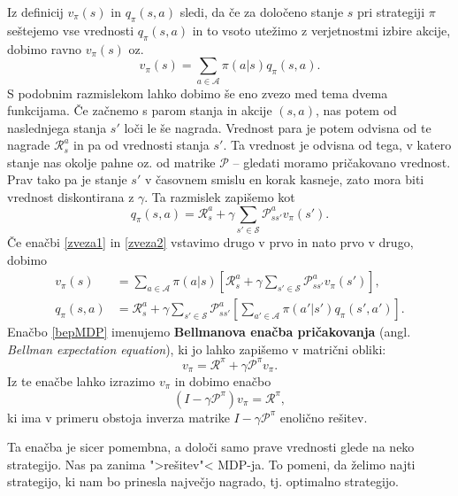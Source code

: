\documentclass[12pt,a4paper]{amsart}
\theoremstyle{definition} %
\theoremstyle{plain} %
\begin{document}
Iz definicij $v_\pi(s)$ in $q_\pi(s, a)$ sledi, da če za določeno stanje $s$ pri strategiji $\pi$ 
seštejemo vse vrednosti $q_\pi(s, a)$ in to vsoto utežimo z verjetnostmi izbire akcije, dobimo ravno 
$v_\pi(s)$ oz. 
\begin{equation}\label{zveza1}
    v_\pi(s) = \sum_{a \in \mathcal{A}} \pi(a|s)q_\pi(s, a).
\end{equation}
S podobnim razmislekom lahko dobimo še eno zvezo med tema dvema funkcijama. Če začnemo s parom stanja 
in akcije $(s, a)$, nas potem od naslednjega stanja $s'$ loči le še nagrada. Vrednost para je potem 
odvisna od te nagrade $\mathcal{R}_s^a$ in pa od vrednosti stanja $s'$. Ta vrednost je odvisna od tega, 
v katero stanje nas okolje pahne oz. od matrike $\mathcal{P}$ -- gledati moramo pričakovano vrednost. 
Prav tako pa je stanje $s'$ v časovnem smislu en korak kasneje, zato mora biti vrednost diskontirana z 
$\gamma$. Ta razmislek zapišemo kot
\begin{equation}\label{zveza2}
    q_\pi(s, a) = \mathcal{R}_s^a + \gamma \sum_{s' \in \mathcal{S}} \mathcal{P}_{ss'}^a v_\pi(s').
\end{equation}
Če enačbi \eqref{zveza1} in \eqref{zveza2} vstavimo drugo v prvo in nato prvo v drugo, dobimo
\begin{align}
    v_\pi(s) &= \sum_{a \in \mathcal{A}} \pi(a|s) \left[\mathcal{R}_s^a + 
    \gamma \sum_{s' \in \mathcal{S}} \mathcal{P}_{ss'}^a v_\pi(s') \right], \label{bepMDP} \\
    q_\pi(s, a) &= \mathcal{R}_s^a + \gamma \sum_{s' \in \mathcal{S}} 
    \mathcal{P}_{ss'}^a \left[\sum_{a' \in \mathcal{A}} \pi(a'|s')q_\pi(s', a') \right].
\end{align}
Enačbo \eqref{bepMDP} imenujemo \textbf{Bellmanova enačba pričakovanja} (angl. \textit{Bellman 
expectation equation}), ki jo lahko zapišemo v matrični obliki:
$$
v_\pi = \mathcal{R}^\pi + \gamma \mathcal{P}^\pi v_\pi.
$$
Iz te enačbe lahko izrazimo $v_\pi$ in dobimo enačbo
$$
(I - \gamma \mathcal{P}^\pi) v_\pi = \mathcal{R}^\pi,
$$
ki ima v primeru obstoja inverza matrike $I - \gamma \mathcal{P}^\pi$ enolično rešitev.

Ta enačba je sicer pomembna, a določi samo prave vrednosti glede na neko strategijo. Nas pa zanima 
">rešitev"< MDP-ja. To pomeni, da želimo najti strategijo, ki nam bo prinesla največjo nagrado, tj. 
optimalno strategijo.
\end{document}
